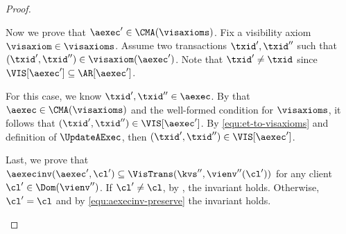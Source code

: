 \begin{proof}
\begin{enumerate}
\begin{enumerate}
            Now we prove that \( \aexec' \in \CMA(\visaxioms) \).
            Fix a visibility axiom \( \visaxiom \in \visaxioms \).
            Assume two transactions \( \txid',\txid''\) such that 
            \( (\txid',\txid'') \in \visaxiom(\aexec') \).
            Note that \( \txid' \neq \txid \) since \( \VIS[\aexec'] \subseteq \AR[\aexec']\).
            \begin{enumerate*}
                For this case, we know \( \txid',\txid'' \in \aexec \).
                By \ih that \( \aexec \in \CMA(\visaxioms)\) 
                and the well-formed condition for  \( \visaxioms \),
                it follows that \( (\txid',\txid'') \in \VIS[\aexec'] \).
                By \cref{equ:et-to-visaxioms} and definition of \( \UpdateAExec \),
                then \( (\txid',\txid'') \in \VIS[\aexec'] \).
            \end{enumerate*}

            Last, we prove that 
            \( \aexecinv(\aexec',\cl') \subseteq \VisTrans(\kvs'',\vienv''(\cl')) \)
            for any client \( \cl' \in \Dom(\vienv'') \).
            If \( \cl' \neq \cl \), by \ih, the invariant holds.
            Otherwise, \( \cl' = \cl \) and by \cref{equ:aexecinv-preserve} the invariant holds. \qedhere
        \end{enumerate}
    \end{enumerate}
\end{proof} 
